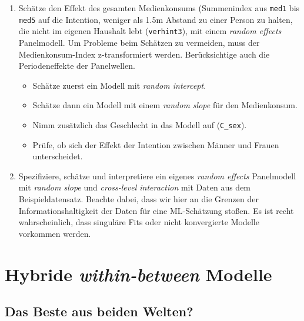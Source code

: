 \documentclass[
]{book}
\providecommand{\tightlist}{%
  \setlength{\itemsep}{0pt}\setlength{\parskip}{0pt}}
\begin{document}
\begin{enumerate}
\def\labelenumi{\arabic{enumi})}
\tightlist
\item
  Schätze den Effekt des gesamten Medienkonsums (Summenindex aus \texttt{med1} bis \texttt{med5} auf die Intention, weniger als 1.5m Abstand zu einer Person zu halten, die nicht im eigenen Haushalt lebt (\texttt{verhint3}), mit einem \emph{random effects} Panelmodell. Um Probleme beim Schätzen zu vermeiden, muss der Medienkonsum-Index z-transformiert werden. Berücksichtige auch die Periodeneffekte der Panelwellen.

  \begin{itemize}
  \tightlist
  \item
    Schätze zuerst ein Modell mit \emph{random intercept}.
  \item
    Schätze dann ein Modell mit einem \emph{random slope} für den Medienkonsum.
  \item
    Nimm zusätzlich das Geschlecht in das Modell auf (\texttt{C\_sex}).
  \item
    Prüfe, ob sich der Effekt der Intention zwischen Männer und Frauen unterscheidet.
  \end{itemize}
\item
  Spezifiziere, schätze und interpretiere ein eigenes \emph{random effects} Panelmodell mit \emph{random slope} und \emph{cross-level interaction} mit Daten aus dem Beispieldatensatz. Beachte dabei, dass wir hier an die Grenzen der Informationshaltigkeit der Daten für eine ML-Schätzung stoßen. Es ist recht wahrscheinlich, dass singuläre Fits oder nicht konvergierte Modelle vorkommen werden.
\end{enumerate}

\hypertarget{hybride-within-between-modelle}{%
\chapter{\texorpdfstring{Hybride \emph{within-between} Modelle}{Hybride within-between Modelle}}\label{hybride-within-between-modelle}}

\hypertarget{das-beste-aus-beiden-welten}{%
\section{Das Beste aus beiden Welten?}\label{das-beste-aus-beiden-welten}}
\end{document}
